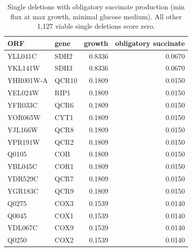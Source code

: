 \begin{longtable}{llrr}
\caption{Single deletions with obligatory succinate production (min flux at max growth, minimal glucose medium). All other 1{,}127 viable single deletions score zero.}\label{tab:singles}\\
\hline\hline
ORF & gene & growth & obligatory succinate\\
\hline
YLL041C & SDH2 & 0.8336 & 0.0670\\
YKL141W & SDH3 & 0.8336 & 0.0670\\
YHR001W-A & QCR10 & 0.1809 & 0.0150\\
YEL024W & RIP1 & 0.1809 & 0.0150\\
YFR033C & QCR6 & 0.1809 & 0.0150\\
YOR065W & CYT1 & 0.1809 & 0.0150\\
YJL166W & QCR8 & 0.1809 & 0.0150\\
YPR191W & QCR2 & 0.1809 & 0.0150\\
Q0105 & COB & 0.1809 & 0.0150\\
YBL045C & COR1 & 0.1809 & 0.0150\\
YDR529C & QCR7 & 0.1809 & 0.0150\\
YGR183C & QCR9 & 0.1809 & 0.0150\\
Q0275 & COX3 & 0.1539 & 0.0140\\
Q0045 & COX1 & 0.1539 & 0.0140\\
YDL067C & COX9 & 0.1539 & 0.0140\\
Q0250 & COX2 & 0.1539 & 0.0140\\
\hline
\end{longtable}

